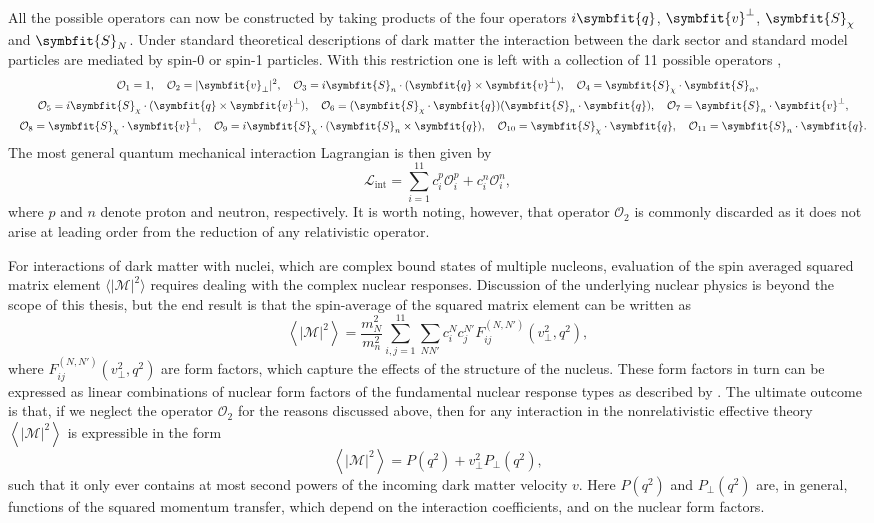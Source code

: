 \documentclass[b5paper, 10pt, twoside]{book}
\renewcommand{\vec}[1]{\symbfit{#1}}
\newcommand{\mean}[1]{\left\langle#1\right\rangle}
\newcommand{\tmean}[1]{\langle#1\rangle}
\begin{document}
All the possible operators can now be constructed by taking products of the four operators $i\vec{q}$, $\vec{v}^\perp$, $\vec{S}_\chi$ and $\vec{S}_N$. Under standard theoretical descriptions of dark matter the interaction between the dark sector and standard model particles are mediated by spin-0 or spin-1 particles. With this restriction one is left with a collection of 11 possible operators \parencite{FitzpatrickEtAl2013},
\begin{gather*}
    \mathcal{O}_1=1,\quad\mathcal{O}_2=|\vec{v}_\perp|^2,\quad\mathcal{O}_3=i\vec{S}_n\cdot(\vec{q}\times\vec{v}^\perp),\quad\mathcal{O}_4=\vec{S}_\chi\cdot\vec{S}_n,\\
    \quad\mathcal{O}_5=i\vec{S}_\chi\cdot(\vec{q}\times\vec{v}^\perp),\quad\mathcal{O}_6=(\vec{S}_\chi\cdot\vec{q})(\vec{S}_n\cdot\vec{q}),\quad\mathcal{O}_7=\vec{S}_n\cdot\vec{v}^\perp,\\
    \quad\mathcal{O}_8=\vec{S}_\chi\cdot\vec{v}^\perp,\quad\mathcal{O}_9=i\vec{S}_\chi\cdot(\vec{S}_n\times\vec{q}),\quad\mathcal{O}_{10}=\vec{S}_\chi\cdot\vec{q},\quad\mathcal{O}_{11}=\vec{S}_n\cdot\vec{q}.
\end{gather*}
The most general quantum mechanical interaction Lagrangian is then given by
\begin{equation}
    \mathcal{L}_\text{int}=\sum_{i=1}^{11}c_i^p\mathcal{O}_i^p+c_i^n\mathcal{O}_i^n,
\end{equation}
where $p$ and $n$ denote proton and neutron, respectively. It is worth noting, however, that operator $\mathcal{O}_2$ is commonly discarded as it does not arise at leading order from the reduction of any relativistic operator.

For interactions of dark matter with nuclei, which are complex bound states of multiple nucleons, evaluation of the spin averaged squared matrix element $\tmean{|\mathcal{M}|^2}$ requires dealing with the complex nuclear responses. Discussion of the underlying nuclear physics is beyond the scope of this thesis, but the end result is that the spin-average of the squared matrix element can be written as
\begin{equation}
    \mean{|\mathcal{M}|^2}=\frac{m_N^2}{m_n^2}\sum_{i,j=1}^{11}\sum_{NN'}c_i^Nc_j^{N'}F_{ij}^{(N,N')}(v_\perp^2,q^2),
\end{equation}
where $F_{ij}^{(N,N')}(v_\perp^2,q^2)$ are form factors, which capture the effects of the structure of the nucleus. These form factors in turn can be expressed as linear combinations of nuclear form factors of the fundamental nuclear response types as described by \textcite{FitzpatrickEtAl2013}. The ultimate outcome is that, if we neglect the operator $\mathcal{O}_2$ for the reasons discussed above, then for any interaction in the nonrelativistic effective theory $\mean{|\mathcal{M}|^2}$ is expressible in the form
\begin{equation}
    \mean{|\mathcal{M}|^2}=P(q^2)+v_\perp^2P_\perp(q^2),
    \label{eq:eft-amplitude-square}
\end{equation}
such that it only ever contains at most second powers of the incoming dark matter velocity $v$. Here $P(q^2)$ and $P_\perp(q^2)$ are, in general, functions of the squared momentum transfer, which depend on the interaction coefficients, and on the nuclear form factors.
\end{document}
